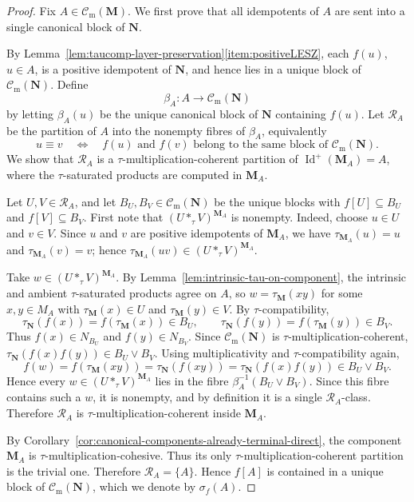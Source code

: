 \documentclass[pdflatex,sn-mathphys-num]{sn-jnl}
\theoremstyle{thmstyleone}%
\theoremstyle{thmstyletwo}%
\theoremstyle{thmstylethree}%
\newcommand{\PosId}{\operatorname{Id}^{+}}
\newcommand{\tprod}[2]{#1\ast_{\tau}#2}
\newcommand{\Cm}{\mathcal C_{\mathrm m}}
\begin{document}
\begin{proof}
Fix \(A\in\Cm(\mathbf M)\).
We first prove that all idempotents of \(A\) are sent into a single canonical block of \(\mathbf N\).

By Lemma~\ref{lem:taucomp-layer-preservation}\eqref{item:positiveLESZ}, each \(f(u)\), \(u\in A\), is a positive idempotent of \(\mathbf N\), and hence lies in a unique block of \(\Cm(\mathbf N)\).
Define
\[
\beta_A\colon A\to \Cm(\mathbf N)
\]
by letting \(\beta_A(u)\) be the unique canonical block of \(\mathbf N\) containing \(f(u)\).
Let \(\mathcal R_A\) be the partition of \(A\) into the nonempty fibres of \(\beta_A\), equivalently
\[
u\equiv v
\quad\Longleftrightarrow\quad
f(u)\text{ and }f(v)\text{ belong to the same block of }\Cm(\mathbf N).
\]
We show that \(\mathcal R_A\) is a \(\tau\)-multiplication-coherent partition of \(\PosId(\mathbf M_A)=A\), where the \(\tau\)-saturated products are computed in \(\mathbf M_A\).

Let \(U,V\in\mathcal R_A\), and let \(B_U,B_V\in\Cm(\mathbf N)\) be the unique blocks with \(f[U]\subseteq B_U\) and \(f[V]\subseteq B_V\).
First note that \((\tprod{U}{V})^{\mathbf M_A}\) is nonempty.
Indeed, choose \(u\in U\) and \(v\in V\).
Since \(u\) and \(v\) are positive idempotents of \(\mathbf M_A\), we have \(\tau_{\mathbf M_A}(u)=u\) and \(\tau_{\mathbf M_A}(v)=v\); hence \(\tau_{\mathbf M_A}(uv)\in(\tprod{U}{V})^{\mathbf M_A}\).

Take \(w\in(\tprod{U}{V})^{\mathbf M_A}\).
By Lemma~\ref{lem:intrinsic-tau-on-component}, the intrinsic and ambient \(\tau\)-saturated products agree on \(A\), so \(w=\tau_{\mathbf M}(xy)\) for some \(x,y\in M_A\) with \(\tau_{\mathbf M}(x)\in U\) and \(\tau_{\mathbf M}(y)\in V\).
By \(\tau\)-compatibility,
\[
\tau_{\mathbf N}(f(x))=f(\tau_{\mathbf M}(x))\in B_U,
\qquad
\tau_{\mathbf N}(f(y))=f(\tau_{\mathbf M}(y))\in B_V.
\]
Thus \(f(x)\in N_{B_U}\) and \(f(y)\in N_{B_V}\).
Since \(\Cm(\mathbf N)\) is \(\tau\)-multiplication-coherent, \(\tau_{\mathbf N}(f(x)f(y))\in B_U\vee B_V\).
Using multiplicativity and \(\tau\)-compatibility again,
\[
f(w)
=
f(\tau_{\mathbf M}(xy))
=
\tau_{\mathbf N}(f(xy))
=
\tau_{\mathbf N}(f(x)f(y))
\in B_U\vee B_V.
\]
Hence every \(w\in(\tprod{U}{V})^{\mathbf M_A}\) lies in the fibre \(\beta_A^{-1}(B_U\vee B_V)\).
Since this fibre contains such a \(w\), it is nonempty, and by definition it is a single \(\mathcal R_A\)-class.
Therefore \(\mathcal R_A\) is \(\tau\)-multiplication-coherent inside \(\mathbf M_A\).

By Corollary~\ref{cor:canonical-components-already-terminal-direct}, the component \(\mathbf M_A\) is \(\tau\)-multiplication-cohesive.
Thus its only \(\tau\)-multiplication-coherent partition is the trivial one.
Therefore \(\mathcal R_A=\{A\}\).
Hence \(f[A]\) is contained in a unique block of \(\Cm(\mathbf N)\), which we denote by \(\sigma_f(A)\).


\end{proof}
\end{document}

